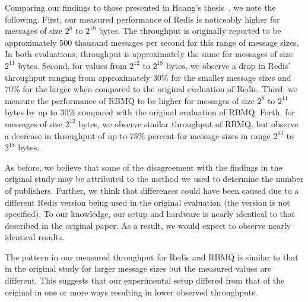 \documentclass[letterpaper,twocolumn,10pt]{article}
\begin{document}
Comparing our findings to those presented in Hoang's thesis~\cite{hoang2019building}, we note the following.
First, our measured performance of Redis is noticeably higher for messages of size $2^{8}$ to $2^{10}$ bytes.
The throughput is originally reported to be approximately 500 thousand messages per second for this range of message sizes.
In both evaluations, throughput is approximately the same for messages of size $2^{11}$ bytes.
Second, for values from $2^{12}$ to $2^{18}$ bytes, we observe a drop in Redis' throughput ranging from approximately 30\% for the smaller message sizes and 70\% for the larger when compared to the original evaluation of Redis.
Third, we measure the performance of RBMQ to be higher for messages of size $2^{8}$ to $2^{11}$ bytes by up to 30\% compared with the original evaluation of RBMQ.
Forth, for messages of size $2^{12}$ bytes, we observe similar throughput of RBMQ, but observe a decrease in throughput of up to 75\% percent for message sizes in range $2^{13}$ to $2^{18}$ bytes.

As before, we believe that some of the disagreement with the findings in the original study may be attributed to the method we used to determine the number of publishers.
Further, we think that differences could have been caused due to a different Redis version being used in the original evaluation (the version is not specified).
To our knowledge, our setup and hardware is nearly identical to that described in the original paper.
As a result, we would expect to observe nearly identical results.


The pattern in our measured throughput for Redis and RBMQ is similar to that in the original study for larger message sizes but the measured values are different.
This suggests that our experimental setup differed from that of the original in one or more ways resulting in lower observed throughputs.
\end{document}
